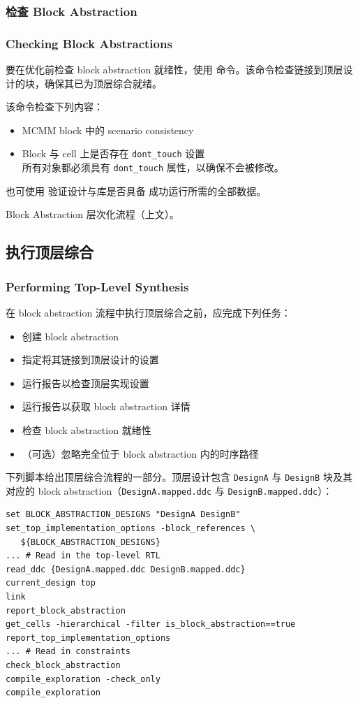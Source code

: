 \subsubsection{检查 Block Abstraction}
\subsubsection*{Checking Block Abstractions}

要在优化前检查 block abstraction 就绪性，使用  命令。该命令检查链接到顶层设计的块，确保其已为顶层综合就绪。

该命令检查下列内容：
\begin{itemize}
  \item MCMM block 中的 scenario consistency
  \item Block 与 cell 上是否存在 \texttt{dont\_touch} 设置\\
        所有对象都必须具有 \texttt{dont\_touch} 属性，以确保不会被修改。
\end{itemize}

也可使用  验证设计与库是否具备  成功运行所需的全部数据。

\begin{seeAlsoBox}
Block Abstraction 层次化流程（上文）。
\end{seeAlsoBox}

\subsection{执行顶层综合}
\subsubsection*{Performing Top-Level Synthesis}

在 block abstraction 流程中执行顶层综合之前，应完成下列任务：
\begin{itemize}
  \item 创建 block abstraction
  \item 指定将其链接到顶层设计的设置
  \item 运行报告以检查顶层实现设置
  \item 运行报告以获取 block abstraction 详情
  \item 检查 block abstraction 就绪性
  \item （可选）忽略完全位于 block abstraction 内的时序路径
\end{itemize}

下列脚本给出顶层综合流程的一部分。顶层设计包含 \texttt{DesignA} 与 \texttt{DesignB} 块及其对应的 block abstraction（\texttt{DesignA.mapped.ddc} 与 \texttt{DesignB.mapped.ddc}）：
\begin{lstlisting}
set BLOCK_ABSTRACTION_DESIGNS "DesignA DesignB"
set_top_implementation_options -block_references \
   ${BLOCK_ABSTRACTION_DESIGNS}
... # Read in the top-level RTL
read_ddc {DesignA.mapped.ddc DesignB.mapped.ddc}
current_design top
link
report_block_abstraction
get_cells -hierarchical -filter is_block_abstraction==true
report_top_implementation_options
... # Read in constraints
check_block_abstraction
compile_exploration -check_only
compile_exploration
\end{lstlisting}


